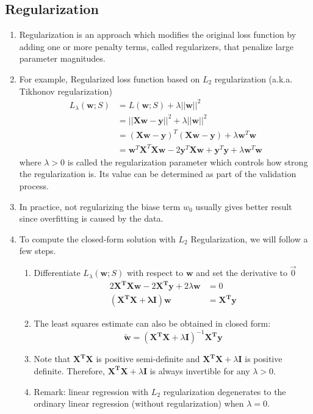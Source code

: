 \documentclass[11pt]{article}
\begin{document}
\subsection{Regularization}
\begin{enumerate}
\item Regularization is an approach which modifies the original loss function by adding one or more penalty terms, called regularizers, that penalize large parameter magnitudes. 
\item For example, Regularized loss function based on $L_2$ regularization (a.k.a. Tikhonov regularization)
\begin{align*}
L_{\lambda} (\mathbf{w}; S) &= L(\mathbf{w}; S) + \lambda ||\mathbf{w}||^2\\
&= ||\mathbf{Xw-y}||^2 + \lambda ||\mathbf{w}||^2\\
&= (\mathbf{Xw-y})^T (\mathbf{Xw-y}) + \lambda \mathbf{w}^T \mathbf{w}\\
&= \mathbf{w}^T \mathbf{X}^T \mathbf{X} \mathbf{w} -2 \mathbf{y}^T \mathbf{X} \mathbf{w} + \mathbf{y}^T \mathbf{y} + \lambda \mathbf{w}^T \mathbf{w}
\end{align*}
where $\lambda >0$ is called the regularization parameter which controls how strong the regularization is. Its value can be determined as part of the validation process.
\item In practice, not regularizing the biase term $w_0$ usually gives better result since overfitting is caused by the data.
\item To compute the closed-form solution with $L_2$ Regularization, we will follow a few steps.
\begin{enumerate}
\item Differentiate $L_\lambda (\mathbf{w}; S)$ with respect to $\mathbf{w}$ and set the derivative to $\vec{0}$
\begin{align*}
2 \mathbf{X^T X w} - 2 \mathbf{X^T y} + 2\lambda \mathbf{w} &= 0\\
(\mathbf{X^T X + \lambda I}) \mathbf{w} &= \mathbf{X^T y}
\end{align*}
\item The least squares estimate can also be obtained in closed form: $$\mathbf{\tilde{w}}= (\mathbf{X^T X} + \lambda \mathbf{I})^{-1} \mathbf{X^T y}$$
\item Note that $\mathbf{X^T X}$ is positive semi-definite and $\mathbf{X^T X} + \lambda \mathbf{I}$ is positive definite. Therefore, $\mathbf{X^T X} + \lambda \mathbf{I}$ is always invertible for any $\lambda > 0$.
\item Remark: linear regression with $L_2$ regularization degenerates to the ordinary linear regression (without regularization) when $\lambda = 0$.

\end{enumerate}
\end{enumerate}
\end{document}
